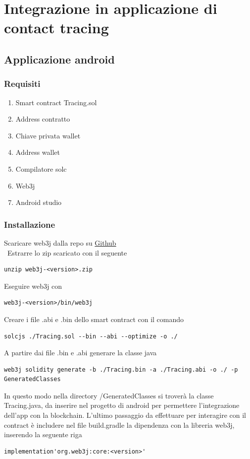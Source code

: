 \chapter{Integrazione in applicazione di contact tracing}

\section{Applicazione android}

\subsection{Requisiti}
\begin{enumerate}
	\item{Smart contract Tracing.sol}
	\item{Address contratto}
	\item{Chiave privata wallet}
	\item{Address wallet}
	\item{Compilatore solc}
	\item{Web3j}
	\item{Android studio}
\end{enumerate}

\subsection{Installazione}
Scaricare web3j dalla repo su \href{https://github.com/web3j/web3j/releases}{Github}\\\
Estrarre lo zip scaricato con il seguente
\begin{lstlisting}[numbers=none]
	unzip web3j-<version>.zip
\end{lstlisting}
Eseguire web3j con 
\begin{lstlisting}[numbers=none]
	web3j-<version>/bin/web3j
\end{lstlisting}
Creare i file .abi e .bin dello smart contract con il comando
\begin{lstlisting}[numbers=none]
	solcjs ./Tracing.sol --bin --abi --optimize -o ./ 
\end{lstlisting}
A partire dai file .bin e .abi generare la classe java
\begin{lstlisting}[numbers=none]
	web3j solidity generate -b ./Tracing.bin -a ./Tracing.abi -o ./ -p GeneratedClasses 
\end{lstlisting}
In questo modo nella directory /GeneratedClasses si troverà la classe Tracing.java, da inserire nel progetto di android per permettere l'integrazione dell'app con la blockchain.
L'ultimo passaggio da effettuare per interagire con il contract è includere nel file build.gradle la dipendenza con la libreria web3j, inserendo la seguente riga
\begin{lstlisting}[numbers=none]
	implementation'org.web3j:core:<version>' 
\end{lstlisting}

